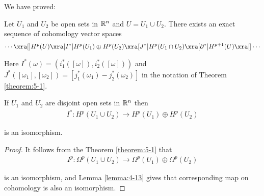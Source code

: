 We have proved:

\begin{theorem}\label{theorem:5-2}
Let $U_1$ and $U_2$ be open sets in $\mathbb{R}^n$ and $U = U_1\cup U_2$.
There exists an exact sequence of cohomology vector spaces
\begin{align*}
  \cdots\xra[]H^p(U)\xra[I^*]H^p(U_1)\oplus H^p(U_2)\xra[J^*]H^p(U_1\cap U_2)\xra[\partial^*]H^{p+1}(U)\xra[]\cdots
\end{align*}

Here $I^*(\omega) = (i^*_1([\omega]), i^*_2([\omega]))$ and $J^*([\omega_1], [\omega_2]) = [j^*_1(\omega_1) - j^*_2(\omega_2)]$
in the notation of Theorem \ref{theorem:5-1}.
\end{theorem}

\begin{corollary}\label{corollary:5-3}
  If $U_1$ and $U_2$ are disjoint open sets in $\mathbb{R}^n$ then
  \begin{align*}
    I^*:H^p(U_1\cup U_2)\to H^p(U_1)\oplus H^p(U_2)
  \end{align*}

  is an isomorphism.
\end{corollary}

\begin{proof}
  It follows from the Theorem \ref{theorem:5-1} that 
  \begin{align*}
    I^p:\Omega^p(U_1\cup U_2)\to\Omega^p(U_1)\oplus\Omega^p(U_2)
  \end{align*}

  is an isomorphism, and Lemma \ref{lemma:4-13} gives that corresponding map on cohomology is also an isomorphism.
\end{proof}


